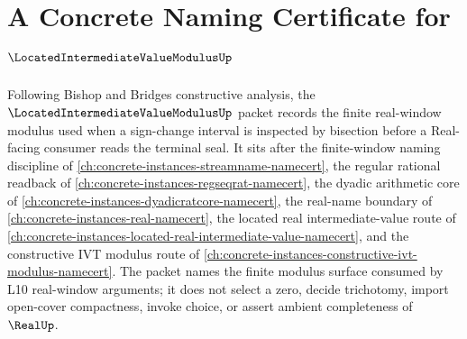 \chapter{A Concrete Naming Certificate for $\LocatedIntermediateValueModulusUp$}
\label{ch:concrete-instances-located-intermediate-value-modulus-namecert}

Following Bishop and Bridges constructive analysis, the $\LocatedIntermediateValueModulusUp$ packet records the finite real-window modulus used when a sign-change interval is inspected by bisection before a Real-facing consumer reads the terminal seal. It sits after the finite-window naming discipline of \autoref{ch:concrete-instances-streamname-namecert}, the regular rational readback of \autoref{ch:concrete-instances-regseqrat-namecert}, the dyadic arithmetic core of \autoref{ch:concrete-instances-dyadicratcore-namecert}, the real-name boundary of \autoref{ch:concrete-instances-real-namecert}, the located real intermediate-value route of \autoref{ch:concrete-instances-located-real-intermediate-value-namecert}, and the constructive IVT modulus route of \autoref{ch:concrete-instances-constructive-ivt-modulus-namecert}. The packet names the finite modulus surface consumed by L10 real-window arguments; it does not select a zero, decide trichotomy, import open-cover compactness, invoke choice, or assert ambient completeness of $\RealUp$.

